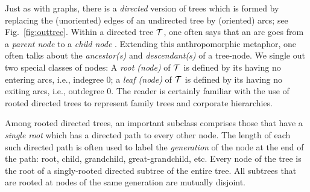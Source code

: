 Just as with graphs, there is a {\em directed} version of trees which
is formed by replacing the (unoriented) edges of an undirected tree by
(oriented) arcs; see Fig.~\ref{fig:outtree}.  Within a directed tree
$\mbox{$\cal T$}$, one often says that an arc goes from a {\it parent node}
 to a {\it child node} .  Extending this anthropomorphic metaphor, one often talks
about the {\it ancestor(s)}  and {\it
  descendant(s)}  of a tree-node.  We
single out two special classes of nodes: A {\it root (node)}
  of $\mbox{$\cal T$}$ is
defined by its having no entering arcs, i.e., indegree $0$; a {\it
  leaf (node)}   of $\mbox{$\cal T$}$ is defined by its having no exiting arcs, i.e.,
outdegree $0$.  The reader is certainly familiar with the use of
rooted directed trees to represent family trees and corporate
hierarchies.

\bigskip

\noindent {}
\bigskip

Among rooted directed trees, an important subclass comprises those
that have a {\em single root} which has a directed path to every other
node.  The length of each such directed path is often used to label
the {\it generation}
of the node at the end of the path: root, child, grandchild,
great-grandchild, etc.
Every node of the tree is the root of a singly-rooted directed
subtree of the entire tree.  All subtrees that are rooted at nodes of
the same generation are mutually disjoint.
\bigskip


